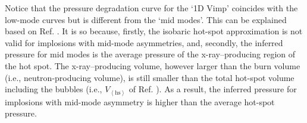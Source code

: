 \documentclass[aip,reprint]{revtex4-1}
\begin{document}
 Notice that the pressure degradation curve for the `1D Vimp' coincides with the low-mode curves but is different from the `mid modes'. This can be explained based on Ref. . It is so because, firstly, the isobaric hot-spot approximation is not valid for implosions with mid-mode asymmetries, and, secondly, the inferred pressure for mid modes is the average pressure of the x-ray--producing region of the hot spot. The x-ray--producing volume, however larger than the burn volume (i.e., neutron-producing volume), is still smaller than the total hot-spot volume including the bubbles (i.e., $V_{\left< \text{hs} \right>}$ of Ref. ). As a result, the inferred pressure for implosions with mid-mode asymmetry is higher than the average hot-spot pressure.

%
\end{document}
